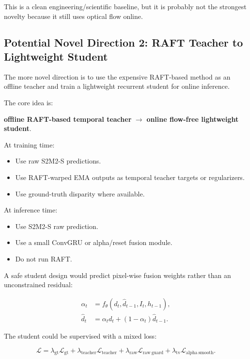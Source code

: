 \documentclass[11pt,a4paper]{article}
\begin{document}
This is a clean engineering/scientific baseline, but it is probably not the strongest novelty because it still uses optical flow online.

\subsection{Potential Novel Direction 2: RAFT Teacher to Lightweight Student}

The more novel direction is to use the expensive RAFT-based method as an offline teacher and train a lightweight recurrent student for online inference.

The core idea is:

\begin{center}
\textbf{offline RAFT-based temporal teacher} $\rightarrow$ \textbf{online flow-free lightweight student}.
\end{center}

At training time:

\begin{itemize}[leftmargin=*]
    \item Use raw S2M2-S predictions.
    \item Use RAFT-warped EMA outputs as temporal teacher targets or regularizers.
    \item Use ground-truth disparity where available.
\end{itemize}

At inference time:

\begin{itemize}[leftmargin=*]
    \item Use S2M2-S raw prediction.
    \item Use a small ConvGRU or alpha/reset fusion module.
    \item Do not run RAFT.
\end{itemize}

A safe student design would predict pixel-wise fusion weights rather than an unconstrained residual:

\begin{align}
    \alpha_t &= f_\theta(d_t, \hat{d}_{t-1}, I_t, h_{t-1}),\\
    \hat{d}_t &= \alpha_t d_t + (1-\alpha_t)\hat{d}_{t-1}.
\end{align}

The student could be supervised with a mixed loss:

\begin{equation}
    \mathcal{L}
    =
    \lambda_{\mathrm{gt}}\mathcal{L}_{\mathrm{gt}}
    +
    \lambda_{\mathrm{teacher}}\mathcal{L}_{\mathrm{teacher}}
    +
    \lambda_{\mathrm{raw}}\mathcal{L}_{\mathrm{raw\ guard}}
    +
    \lambda_{\mathrm{tv}}\mathcal{L}_{\mathrm{alpha\ smooth}}.
\end{equation}
\end{document}
